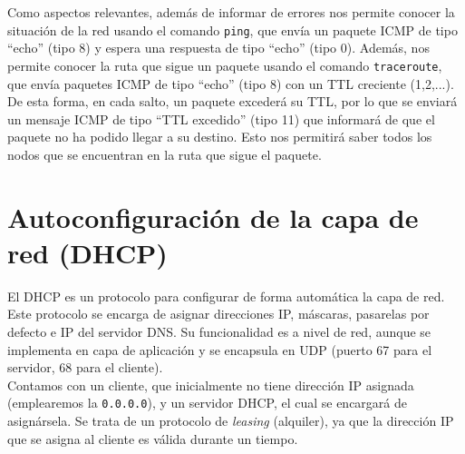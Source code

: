 Como aspectos relevantes, además de informar de errores nos permite conocer la situación de la red usando el comando \verb|ping|, que envía un paquete \acrshort{ICMP} de tipo ``echo'' (tipo 8) y espera una respuesta de tipo ``echo'' (tipo 0). Además, nos permite conocer la ruta que sigue un paquete usando el comando \verb|traceroute|, que envía paquetes \acrshort{ICMP} de tipo ``echo'' (tipo 8) con un \acrshort{TTL} creciente (1,2,...). De esta forma, en cada salto, un paquete excederá su \acrshort{TTL}, por lo que se enviará un mensaje \acrshort{ICMP} de tipo ``TTL excedido'' (tipo 11) que informará de que el paquete no ha podido llegar a su destino. Esto nos permitirá saber todos los nodos que se encuentran en la ruta que sigue el paquete.


\section{Autoconfiguración de la capa de red (\acrshort{DHCP})}

El \acrfull{DHCP} es un protocolo para configurar de forma automática la capa de red. Este protocolo se encarga de asignar direcciones IP, máscaras, pasarelas por defecto e IP del servidor \acrshort{DNS}. Su funcionalidad es a nivel de red, aunque se implementa en capa de aplicación y se encapsula en \acrshort{UDP} (puerto 67 para el servidor, 68 para el cliente).\\

Contamos con un cliente, que inicialmente no tiene dirección IP asignada (emplearemos la \verb|0.0.0.0|), y un servidor \acrshort{DHCP}, el cual se encargará de asignársela. Se trata de un protocolo de \textit{leasing} (alquiler), ya que la dirección IP que se asigna al cliente es válida durante un tiempo.\\

